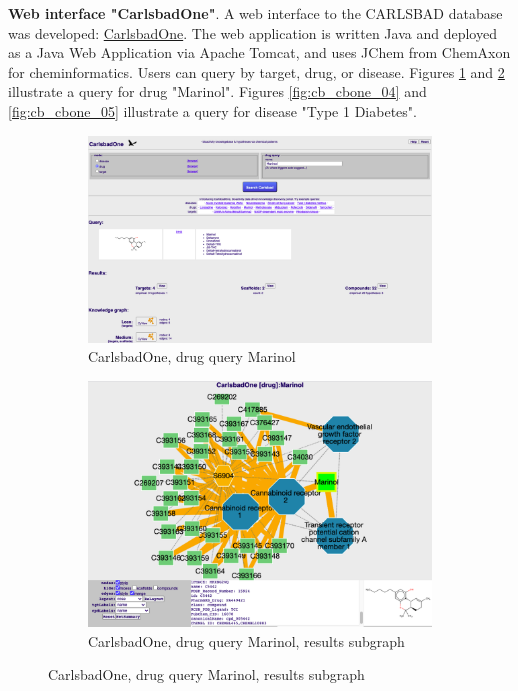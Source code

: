 \textbf{Web interface "CarlsbadOne"}. A web interface to the CARLSBAD database was developed:  \href{https://datascience.unm.edu/tomcat/carlsbad/carlsbadone}{CarlsbadOne}. The web application is written Java and deployed as a Java Web Application via Apache Tomcat, and uses JChem from ChemAxon for cheminformatics. Users can query by target, drug, or disease. Figures \ref{fig:cb_cbone_01} and \ref{fig:cb_cbone_02} illustrate a query for drug "Marinol". Figures \ref{fig:cb_cbone_04} and \ref{fig:cb_cbone_05} illustrate a query for disease "Type 1 Diabetes".

\begin{figure}
\centering
\begin{subfigure}{0.8\textwidth}
\includegraphics[width=0.95\linewidth]{figures/carlsbad/CARLSBAD_CBOne_Marinol_01.png} 
\caption{CarlsbadOne, drug query Marinol}
\label{fig:cb_cbone_01}
\end{subfigure}
\begin{subfigure}{0.8\textwidth}
\includegraphics[width=0.95\linewidth]{figures/carlsbad/CARLSBAD_CBOne_Marinol_02.png}
\caption{CarlsbadOne, drug query Marinol, results subgraph}
\label{fig:cb_cbone_02}
\end{subfigure}
\caption{CarlsbadOne, drug query Marinol, results subgraph}
\label{fig:cb_cbone_03}
\end{figure}


